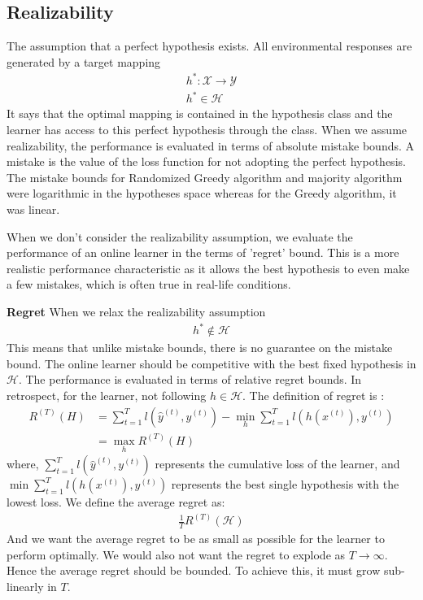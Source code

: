 \documentclass[11pt]{article}
\DeclareMathOperator*{\minimize}{min}
\DeclareMathOperator*{\maximize}{max}
\begin{document}
\subsection{Realizability}

\normalfont
The assumption that a perfect hypothesis exists. All environmental responses are generated by a target mapping 
\begin{align*}
   h^{*} : \mathcal{X} \rightarrow \mathcal{Y}
   \\
   h^{*} \in \mathcal{H}
\end{align*}
It says that the optimal mapping is contained in the hypothesis class and the learner has access to this perfect hypothesis through the class.
When we assume realizability, the performance is evaluated in terms of absolute mistake bounds. A mistake is the value of the loss function for not adopting the perfect hypothesis. The mistake bounds for Randomized Greedy algorithm and majority algorithm were logarithmic in the hypotheses space whereas for the Greedy algorithm, it was linear.

When we don't consider the realizability assumption, we evaluate the performance of an online learner in the terms of 'regret' bound. This is a more realistic performance characteristic as it allows the best hypothesis to even make a few mistakes, which is often true in real-life conditions.

\normalfont\textbf{Regret} 
When we relax the realizability assumption
\begin{align*}
    h^{*} \notin \mathcal{H}
\end{align*}
This means that unlike mistake bounds, there is no guarantee on the mistake bound. The online learner should be competitive with the best fixed hypothesis in $\mathcal{H}$. The performance is evaluated in terms of relative regret bounds. In retrospect, for the learner, not following $ h \in \mathcal{H}$. The definition of regret is : 
\begin{align}
    R^{(T)}(H)&=\sum_{t=1}^{T} l(\hat{y}^{(t)}, y^{(t)}) - \minimize_{h}  \sum_{t=1}^{T} l(h(x^{(t)}), y^{(t)})\label{def:regret}
    \\
    &= \maximize_{h} R^{(T)}(H)
\end{align} 
\normalfont
where, $\sum_{t=1}^{T} l(\hat{y}^{(t)}, y^{(t)})$ represents the cumulative loss of the learner, and $\minimize\sum_{t=1}^{T} l(h(x^{(t)}), y^{(t)})$ represents the best single hypothesis with the lowest loss. We define the average regret as:
\begin{align}
    \frac{1}{T}R^{(T)}(\mathcal{H})
\end{align}
And we want the average regret to be as small as possible for the learner to perform optimally. We would also not want the regret to explode as $T \rightarrow \infty$. Hence the average regret should be bounded. To achieve this, it must grow sub-linearly in $T$.
\end{document}
